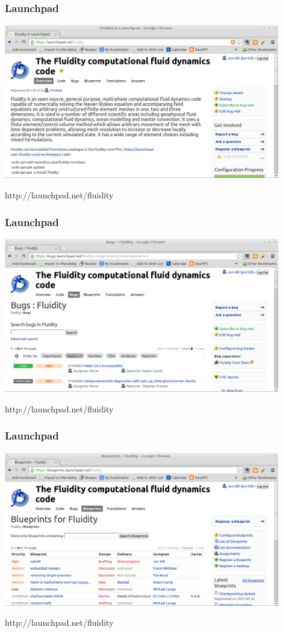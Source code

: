 \documentclass[12pt]{beamer}
\begin{document}
\begin{frame}
        \frametitle{Launchpad}
\begin{center}
    \includegraphics[width=0.9\textwidth]{images/launchpad-home.png}
\end{center}
http://launchpad.net/fluidity
\end{frame}
\begin{frame}
        \frametitle{Launchpad}
\begin{center}
    \includegraphics[width=0.9\textwidth]{images/launchpad-bugs.png}
\end{center}
http://launchpad.net/fluidity
\end{frame}
\begin{frame}
        \frametitle{Launchpad}
\begin{center}
    \includegraphics[width=0.9\textwidth]{images/launchpad-blueprint.png}
\end{center}
http://launchpad.net/fluidity
\end{frame}
\end{document}
